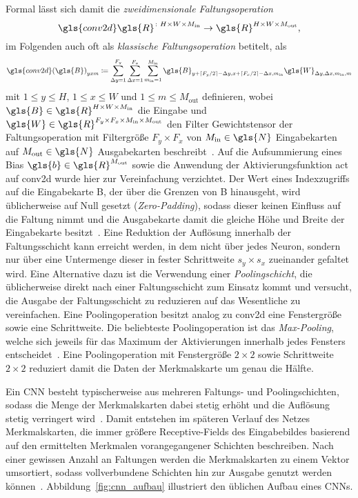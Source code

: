 Formal lässt sich damit die \emph{zweidimensionale Faltungsoperation}
\begin{equation*}
  \gls{conv2d} \gls{R}^{\colon H \times W \times M_{\mathrm{in}}} \to \gls{R}^{H \times W \times M_{\mathrm{out}}},
\end{equation*}
im Folgenden auch oft als \emph{klassische Faltungsoperation} betitelt, als
\begin{equation*}
  {\gls{conv2d}\left(\gls{B}\right)}_{yxm} \coloneqq \sum_{\Delta y = 1}^{F_y} \sum_{\Delta x = 1}^{F_x} \sum_{m_{\mathrm{in}} = 1}^{M_\mathrm{in}} \gls{B}_{y + \left\lceil F_y/2 \right\rceil - \Delta y, x + \left\lceil F_x/2 \right\rceil - \Delta x, m_{\mathrm{in}}} \gls{W}_{\Delta y, \Delta x, m_{\mathrm{in}}, m}
\end{equation*}
mit $1 \leq y \leq H$, $1 \leq x \leq W$ und $1 \leq m \leq M_{\mathrm{out}}$ definieren, wobei $\gls{B} \in \gls{R}^{H \times W \times M_{\mathrm{in}}}$ die Eingabe und $\gls{W} \in \gls{R}^{F_y \times F_x \times M_{\mathrm{in}} \times M_{\mathrm{out}}}$ den Filter \bzw{} Gewichtstensor der Faltungsoperation mit Filtergröße $F_y \times F_x$ von $M_{\mathrm{in}} \in \gls{N}$ Eingabekarten auf $M_{\mathrm{out}} \in \gls{N}$ Ausgabekarten beschreibt~\cite{tensorflow}.
Auf die Aufsummierung eines Bias $\gls{b} \in \gls{R}^{M_{\mathrm{out}}}$ sowie die Anwendung der Aktivierungsfunktion \gls{act} auf \gls{conv2d} wurde hier zur Vereinfachung verzichtet.
Der Wert eines Indexzugriffs auf die Eingabekarte \gls{B}, der über die Grenzen von \gls{B} hinausgeht, wird üblicherweise auf Null gesetzt (\emph{Zero-Padding}), sodass dieser keinen Einfluss auf die Faltung nimmt und die Ausgabekarte damit die gleiche Höhe und Breite der Eingabekarte besitzt~\cite{tensorflow}.
Eine Reduktion der Auflösung innerhalb der Faltungsschicht kann erreicht werden, in dem nicht über jedes Neuron, sondern nur über eine Untermenge dieser in fester Schrittweite $s_y \times s_x$ zueinander gefaltet wird.
Eine Alternative dazu ist die Verwendung einer \emph{Poo\-ling\-sch\-icht}, die üblicherweise direkt nach einer Faltungsschicht zum Einsatz kommt und versucht, die Ausgabe der Faltungsschicht zu reduzieren \bzw{} auf das Wesentliche zu vereinfachen.
Eine Poolingoperation besitzt analog zu \gls{conv2d} eine Fenstergröße sowie eine Schrittweite.
Die beliebteste Poolingoperation ist das \emph{Max-Pooling}, welche sich jeweils für das Maximum der Aktivierungen innerhalb jedes Fensters entscheidet~\cite{Nielsen}.
Eine Poolingoperation mit Fenstergröße $2 \times 2$ sowie Schrittweite $2 \times 2$ reduziert damit die Daten der Merkmalskarte um genau die Hälfte.

Ein \gls{CNN} besteht typischerweise aus mehreren Faltungs- und Poolingschichten, sodass die Menge der Merkmalskarten dabei stetig erhöht und die Auflösung stetig verringert wird~\cite{Nielsen}.
Damit entstehen im späteren Verlauf des Netzes Merkmalskarten, die immer größere Receptive-Fields des Eingabebildes basierend auf den ermittelten Merkmalen vorangegangener Schichten beschreiben.
Nach einer gewissen Anzahl an Faltungen werden die Merkmalskarten zu einem Vektor umsortiert, sodass vollverbundene Schichten hin zur Ausgabe genutzt werden können~\cite{Nielsen}.
Abbildung~\ref{fig:cnn_aufbau} illustriert den üblichen Aufbau eines \glspl{CNN}.

